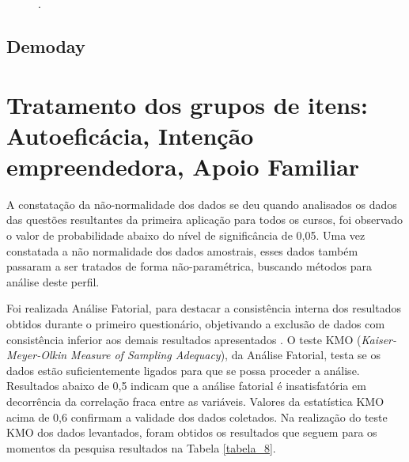 \begin{figure}[H]
\qquad
{}
.
\label{figura_30}
\end{figure}

\subsection{Demoday}


\section{Tratamento dos grupos de itens: Autoeficácia, Intenção empreendedora, Apoio Familiar}

A constatação da não-normalidade dos dados se deu quando
analisados os dados das questões resultantes da primeira aplicação para todos os cursos, foi observado o valor de probabilidade abaixo do nível de significância de 0,05. Uma vez constatada a não normalidade dos dados amostrais, esses dados também passaram a ser tratados de forma não-paramétrica, buscando métodos para análise deste perfil. 


Foi realizada Análise Fatorial, para destacar a consistência interna dos resultados obtidos durante o primeiro questionário, objetivando a exclusão de dados com consistência inferior aos demais resultados apresentados . O teste
KMO (\textit{Kaiser-Meyer-Olkin Measure of Sampling Adequacy}), da Análise Fatorial, testa se os dados estão suficientemente ligados para que se possa proceder a análise. Resultados abaixo de 0,5 indicam que a análise fatorial é insatisfatória em decorrência da correlação fraca entre as variáveis. Valores da estatística KMO acima de 0,6 confirmam a validade dos dados coletados. Na realização do teste KMO dos dados levantados, foram obtidos os resultados que seguem para os momentos da pesquisa resultados na Tabela \ref{tabela_8}.

